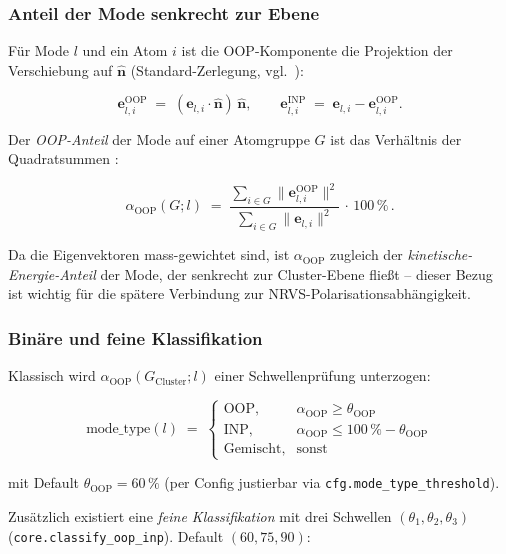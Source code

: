 \documentclass[11pt,a4paper,twoside]{article}
\newcommand{\evec}{\mathbf{e}}
\newcommand{\nhat}{\hat{\mathbf{n}}}
\newcommand{\OOP}{\mathrm{OOP}}
\newcommand{\INP}{\mathrm{INP}}
\theoremstyle{remark}
\begin{document}
\subsubsection*{Anteil der Mode senkrecht zur Ebene}

F\"ur Mode $l$ und ein Atom $i$ ist die OOP-Komponente die Projektion
der Verschiebung auf $\nhat$ (Standard-Zerlegung, vgl.\
\cite{Gee2021}):

\begin{equation}
  \evec_{l,i}^{\OOP} \;=\; (\evec_{l,i} \cdot \nhat)\, \nhat ,
  \qquad
  \evec_{l,i}^{\INP} \;=\; \evec_{l,i} - \evec_{l,i}^{\OOP} .
  \label{eq:oop-projektion}
\end{equation}

Der \emph{OOP-Anteil} der Mode auf einer Atomgruppe $G$ ist das
Verh\"altnis der Quadratsummen \cite{Gee2021}:

\begin{equation}
  \alpha_{\OOP}(G; l) \;=\;
  \frac{\sum_{i \in G} \lVert\evec_{l,i}^{\OOP}\rVert^2}
       {\sum_{i \in G} \lVert\evec_{l,i}\rVert^2} \,\cdot\, 100\,\%
  \,.
  \label{eq:oop-anteil}
\end{equation}

Da die Eigenvektoren mass-gewichtet sind, ist
$\alpha_{\OOP}$ zugleich der \emph{kinetische-Energie-Anteil} der Mode,
der senkrecht zur Cluster-Ebene flie\ss t -- dieser Bezug ist wichtig
f\"ur die sp\"atere Verbindung zur NRVS-Polarisationsabh\"angigkeit.

\subsubsection*{Bin\"are und feine Klassifikation}

Klassisch wird $\alpha_{\OOP}(G_{\text{Cluster}}; l)$ einer
Schwellenpr\"ufung unterzogen:

\begin{equation}
  \text{mode\_type}(l) \;=\;
  \begin{cases}
    \OOP, & \alpha_{\OOP} \geq \theta_{\text{OOP}} \\
    \INP, & \alpha_{\OOP} \leq 100\,\% - \theta_{\text{OOP}} \\
    \text{Gemischt}, & \text{sonst}
  \end{cases}
\end{equation}

mit Default $\theta_{\text{OOP}} = 60\,\%$ (per Config justierbar via
\texttt{cfg.mode\_type\_threshold}).

Zus\"atzlich existiert eine \emph{feine Klassifikation} mit drei
Schwellen $(\theta_1, \theta_2, \theta_3)$
(\texttt{core.classify\_oop\_inp}). Default $(60, 75, 90)$:
\end{document}
